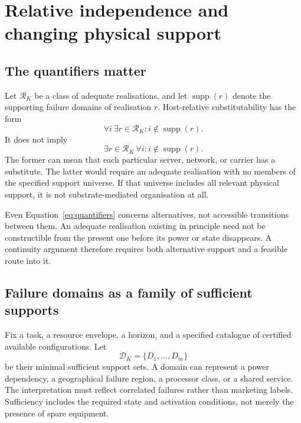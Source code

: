 \documentclass[11pt,a4paper]{article}
\theoremstyle{definition}
\theoremstyle{remark}
\newcommand{\calK}{K}
\DeclareMathOperator{\supp}{supp}
\begin{document}



\section{Relative independence and changing physical support}\label{sec:independence}
\subsection{The quantifiers matter}
Let $\mathscr R_{\calK}$ be a class of adequate realisations, and let $\supp(r)$ denote the supporting failure domains of realisation $r$. Host-relative substitutability has the form
\begin{equation}\label{eq:quantifiers}
 \forall i\ \exists r\in\mathscr R_{\calK}:i\notin\supp(r).
\end{equation}
It does not imply
\[
 \exists r\in\mathscr R_{\calK}\ \forall i:i\notin\supp(r).
\]
The former can mean that each particular server, network, or carrier has a substitute. The latter would require an adequate realisation with no members of the specified support universe. If that universe includes all relevant physical support, it is not substrate-mediated organisation at all.

Even Equation~\eqref{eq:quantifiers} concerns alternatives, not accessible transitions between them. An adequate realisation existing in principle need not be constructible from the present one before its power or state disappears. A continuity argument therefore requires both alternative support and a feasible route into it.

\subsection{Failure domains as a family of sufficient supports}
Fix a task, a resource envelope, a horizon, and a specified catalogue of certified available configurations. Let
\[
 \mathscr D_{\calK}=\{D_1,\ldots,D_m\}
\]
be their minimal sufficient support sets. A domain can represent a power dependency, a geographical failure region, a processor class, or a shared service. The interpretation must reflect correlated failures rather than marketing labels. Sufficiency includes the required state and activation conditions, not merely the presence of spare equipment.
\end{document}
